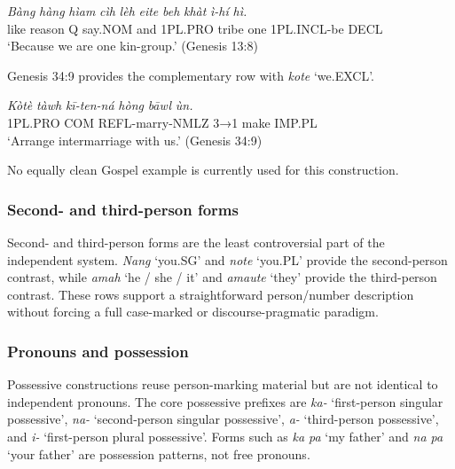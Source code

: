\documentclass[
  11pt,
  a4paper,
]{article}
\newcommand{\tdim}[1]{\textit{#1}}
\newcommand{\tdimword}[1]{\textit{#1}}
\renewcommand{\textsc}[1]{{\footnotesize\MakeUppercase{#1}}}
\newcommand{\glossquote}[1]{`#1'}
\begin{document}
\begin{exe}
\ex \label{ex:pro-eite}
\gll \tdimword{Bàng} \tdimword{hàng} \tdimword{hìam} \tdimword{cìh} \tdimword{lèh} \tdimword{eite} \tdimword{beh} \tdimword{khàt} \tdimword{ì-hí} \tdimword{hì.} \\
     like reason \textsc{q} say.\textsc{nom} and \textsc{1pl}.\textsc{pro} tribe one \textsc{1pl}.\textsc{incl}-be \textsc{decl} \\
\glt \glossquote{Because we are one kin-group.} (Genesis 13:8)
\end{exe}

Genesis 34:9 provides the complementary row with \tdim{kote}
\glossquote{we.EXCL}.

\begin{exe}
\ex \label{ex:pro-kote}
\gll \tdimword{Kòtè} \tdimword{tàwh} \tdimword{kī-ten-ná} \tdimword{hòng} \tdimword{bāwl} \tdimword{ùn.} \\
     \textsc{1pl}.\textsc{pro} \textsc{com} \textsc{refl}-marry-\textsc{nmlz} \textsc{3→1} make \textsc{imp}.\textsc{pl} \\
\glt \glossquote{Arrange intermarriage with us.} (Genesis 34:9)
\end{exe}

No equally clean Gospel example is currently used for this construction.

\subsubsection{Second- and third-person
forms}\label{second--and-third-person-forms}

Second- and third-person forms are the least controversial part of the
independent system. \tdim{Nang} \glossquote{you.SG} and \tdim{note}
\glossquote{you.PL} provide the second-person contrast, while
\tdim{amah} \glossquote{he / she / it} and \tdim{amaute}
\glossquote{they} provide the third-person contrast. These rows support
a straightforward person/number description without forcing a full
case-marked or discourse-pragmatic paradigm.

\subsubsection{Pronouns and possession}\label{pronouns-and-possession}

Possessive constructions reuse person-marking material but are not
identical to independent pronouns. The core possessive prefixes are
\tdim{ka-} \glossquote{first-person singular possessive}, \tdim{na-}
\glossquote{second-person singular possessive}, \tdim{a-}
\glossquote{third-person possessive}, and \tdim{i-}
\glossquote{first-person plural possessive}. Forms such as \tdim{ka pa}
\glossquote{my father} and \tdim{na pa} \glossquote{your father} are
possession patterns, not free pronouns.
\end{document}
